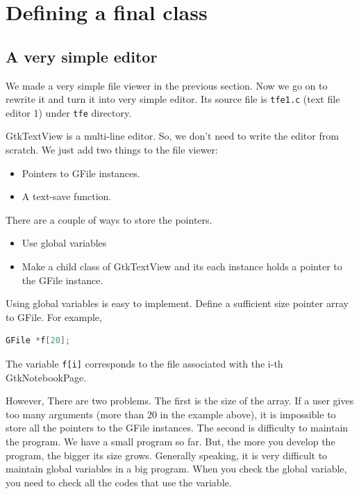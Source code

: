 \section{Defining a final class}\label{defining-a-final-class}

\subsection{A very simple editor}\label{a-very-simple-editor}

We made a very simple file viewer in the previous section. Now we go on
to rewrite it and turn it into very simple editor. Its source file is
\passthrough{\lstinline!tfe1.c!} (text file editor 1) under
\passthrough{\lstinline!tfe!} directory.

GtkTextView is a multi-line editor. So, we don't need to write the
editor from scratch. We just add two things to the file viewer:

\begin{itemize}
\tightlist
\item
  Pointers to GFile instances.
\item
  A text-save function.
\end{itemize}

There are a couple of ways to store the pointers.

\begin{itemize}
\tightlist
\item
  Use global variables
\item
  Make a child class of GtkTextView and its each instance holds a
  pointer to the GFile instance.
\end{itemize}

Using global variables is easy to implement. Define a sufficient size
pointer array to GFile. For example,

\begin{lstlisting}[language=C]
GFile *f[20];
\end{lstlisting}

The variable \passthrough{\lstinline!f[i]!} corresponds to the file
associated with the i-th GtkNotebookPage.

However, There are two problems. The first is the size of the array. If
a user gives too many arguments (more than 20 in the example above), it
is impossible to store all the pointers to the GFile instances. The
second is difficulty to maintain the program. We have a small program so
far. But, the more you develop the program, the bigger its size grows.
Generally speaking, it is very difficult to maintain global variables in
a big program. When you check the global variable, you need to check all
the codes that use the variable.

